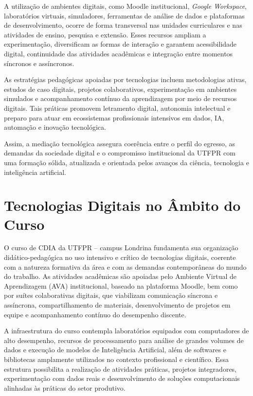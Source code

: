 A utilização de ambientes digitais, como Moodle institucional, \textit{Google Workspace}, laboratórios virtuais, simuladores, ferramentas de análise de dados e plataformas de desenvolvimento, ocorre de forma transversal nas unidades curriculares e nas atividades de ensino, pesquisa e extensão. Esses recursos ampliam a experimentação, diversificam as formas de interação e garantem acessibilidade digital, continuidade das atividades acadêmicas e integração entre momentos síncronos e assíncronos.

As estratégias pedagógicas apoiadas por tecnologias incluem metodologias ativas, estudos de caso digitais, projetos colaborativos, experimentação em ambientes simulados e acompanhamento contínuo da aprendizagem por meio de recursos digitais. Tais práticas promovem letramento digital, autonomia intelectual e preparo para atuar em ecossistemas profissionais intensivos em dados, IA, automação e inovação tecnológica.

Assim, a mediação tecnológica assegura coerência entre o perfil do egresso, as demandas da sociedade digital e o compromisso institucional da UTFPR com uma formação sólida, atualizada e orientada pelos avanços da ciência, tecnologia e inteligência artificial.

\section{Tecnologias Digitais no Âmbito do Curso}

O curso de CDIA da UTFPR – campus Londrina fundamenta sua organização didático-pedagógica no uso intensivo e crítico de tecnologias digitais, coerente com a natureza formativa da área e com as demandas contemporâneas do mundo do trabalho. As atividades acadêmicas são apoiadas pelo Ambiente Virtual de Aprendizagem (AVA) institucional, baseado na plataforma Moodle, bem como por suítes colaborativas digitais, que viabilizam comunicação síncrona e assíncrona, compartilhamento de materiais, desenvolvimento de projetos em equipe e acompanhamento contínuo do desempenho discente.

A infraestrutura do curso contempla laboratórios equipados com computadores de alto desempenho, recursos de processamento para análise de grandes volumes de dados e execução de modelos de Inteligência Artificial, além de softwares e bibliotecas amplamente utilizados no contexto profissional e científico. Essa estrutura possibilita a realização de atividades práticas, projetos integradores, experimentação com dados reais e desenvolvimento de soluções computacionais alinhadas às práticas do setor produtivo.

